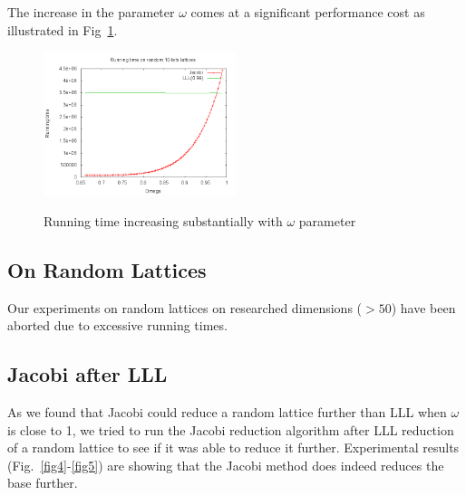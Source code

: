 \documentclass[10pt, a4paper]{article}
\begin{document}
The increase in the parameter $\omega$ comes at a significant performance cost as illustrated in Fig~\ref{fig3}.

\begin{figure}[H]
\centering
\includegraphics[width=0.5\textwidth]{results-graphs/runningtime.png}
\label{fig3}
\caption{Running time increasing substantially with $\omega$ parameter}
\end{figure}

\subsection{On Random Lattices}

Our experiments on random lattices on researched dimensions ($> 50$) have been aborted due to excessive running times.

\subsection{Jacobi after LLL}

As we found that Jacobi could reduce a random lattice further than LLL when $\omega$ is close to 1, we tried to run the Jacobi reduction algorithm after LLL reduction of a random lattice to see if it was able to reduce it further. Experimental results (Fig.~\ref{fig4}-\ref{fig5}) are showing that the Jacobi method does indeed reduces the base further.
\end{document}
